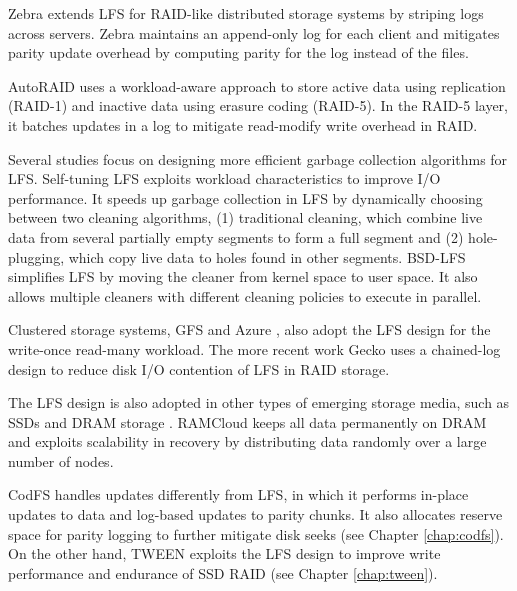 Zebra \cite{hartman95} extends LFS for RAID-like distributed storage systems by
striping logs across servers. Zebra maintains an append-only log for each client
and mitigates parity update overhead by computing parity for the log instead of
the files. 

AutoRAID \cite{wilkes95} uses a workload-aware approach to store active data
using replication (RAID-1) and inactive data using erasure coding (RAID-5). In
the RAID-5 layer, it batches updates in a log to mitigate read-modify write
overhead in RAID.

Several studies focus on designing more efficient garbage collection algorithms
for LFS. Self-tuning LFS \cite{matthews97} exploits workload characteristics to
improve I/O performance. It speeds up garbage collection in LFS by dynamically
choosing between two cleaning algorithms, (1) traditional cleaning, which
combine live data from several partially empty segments to form a full segment
and (2) hole-plugging, which copy live data to holes found in other segments.
BSD-LFS \cite{seltzer93,seltzer95} simplifies LFS by moving the cleaner from
kernel space to user space. It also allows multiple cleaners with different
cleaning policies to execute in parallel.

Clustered storage systems, GFS \cite{ghemawat03} and Azure \cite{calder11}, also
adopt the LFS design for the write-once read-many workload.  The more recent
work Gecko \cite{shin13} uses a chained-log design to reduce disk I/O contention
of LFS in RAID storage.  

The LFS design is also adopted in other types of emerging storage media, such as
SSDs \cite{agrawal08} and DRAM storage \cite{ongaro11}.  RAMCloud
\cite{ongaro11} keeps all data
permanently on DRAM and exploits scalability in recovery by distributing data
randomly over a large number of nodes. 

CodFS handles updates differently from LFS, in which it performs in-place
updates to data and log-based updates to parity chunks.  It also allocates
reserve space for parity logging to further mitigate disk seeks (see Chapter
\ref{chap:codfs}).  On the other
hand, TWEEN exploits the LFS design to improve write performance and endurance
of SSD RAID (see Chapter \ref{chap:tween}).




